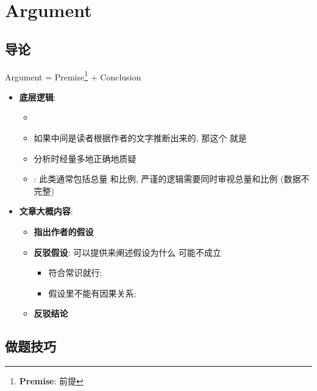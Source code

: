 \chapter{Argument}

\section{导论}

  \begin{center}
    Argument = Premise\footnote{\textbf{Premise}: 前提} + Conclusion
  \end{center}

  \begin{itemize}
    \item \textbf{底层逻辑}:
    \begin{itemize}
      \item {}
      \item 如果中间是读者根据作者的文字推断出来的, 那这个
      就是
      \item 分析时经量多地正确地质疑
      \item {}: 此类通常包括总量
      和比例, 严谨的逻辑需要同时审视总量和比例 (数据不完整)
    \end{itemize}

    \item \textbf{文章大概内容}:
    \begin{itemize}
      \item \textbf{指出作者的假设}
      \item \textbf{反驳假设}: 可以提供来阐述假设为什么
      可能不成立
      \begin{itemize}
        \item 符合常识就行;
        \item 假设里不能有因果关系;
      \end{itemize}

      \item \textbf{反驳结论}
    \end{itemize}
  \end{itemize}

\section{做题技巧}

